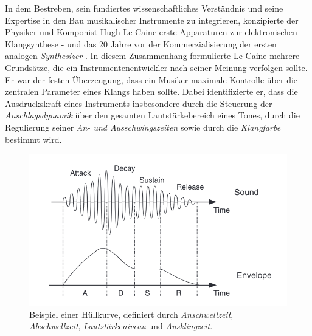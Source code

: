 \documentclass[
  a4paper,  %
  twoside,  %
  bibliography=totoc,
  headsepline,
  cleardoublepage=empty,
  parskip=half,
  draft=false
]{scrbook}
\begin{document}
In dem Bestreben, sein fundiertes wissenschaftliches Verständnis und seine Expertise in den Bau musikalischer Instrumente zu integrieren, konzipierte der Physiker und Komponist Hugh Le Caine erste Apparaturen zur elektronischen Klangsynthese - und das 20 Jahre vor der Kommerzialisierung der ersten analogen \emph{Synthesizer} \cite{young_gale_hugh_2013}. In diesem Zusammenhang formulierte Le Caine mehrere Grundsätze, die ein Instrumentenentwickler nach seiner Meinung verfolgen sollte. Er war der festen Überzeugung, dass ein Musiker maximale Kontrolle über die zentralen Parameter eines Klangs haben sollte. Dabei identifizierte er, dass die Ausdruckskraft eines Instruments insbesondere durch die Steuerung der \emph{Anschlagsdynamik} über den gesamten Lautstärkebereich eines Tones, durch die Regulierung seiner \emph{An- und Ausschwingszeiten} sowie durch die \emph{Klangfarbe} bestimmt wird. \cite{ruschkowski_elektronische_2019}

\begin{figure}[h]
  \centering
  \includegraphics[width=.7\textwidth]{graphics/ADSR.png}
  \caption[Hüllkurve]{Beispiel einer Hüllkurve, definiert durch \emph{Anschwellzeit}, \emph{Abschwellzeit}, \emph{Lautstärkeniveau} und \emph{Ausklingzeit}. \cite{russ_sound_2009}}
  \label{fig:adsr}
\end{figure}
\end{document}
